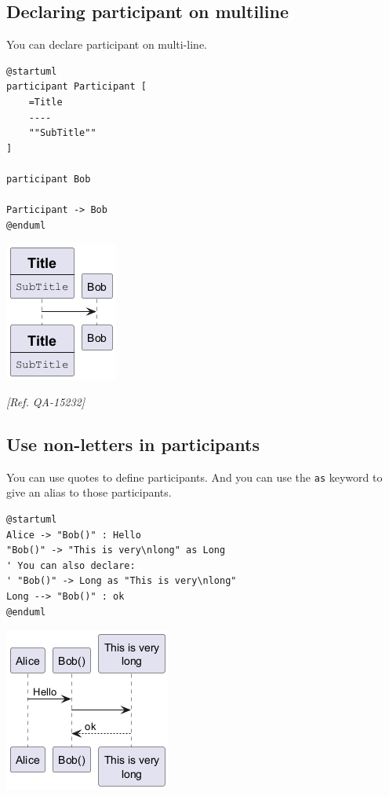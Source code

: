 \subsection{Declaring participant on multiline}


You can declare participant on multi-line.


\begin{verbatim}
@startuml
participant Participant [
    =Title
    ----
    ""SubTitle""
]

participant Bob

Participant -> Bob
@enduml
\end{verbatim}
\begin{center}
\includegraphics[scale=0.60]{imgw/img-2aeb582e872a4b823c6ed833d727d9a1.png}
\end{center}


\textit{[Ref. QA-15232]}
%
%
\subsection{Use non-letters in participants}




You can use quotes to define participants.
And you can use the \texttt{as} keyword to give an alias to those participants.
\begin{verbatim}
@startuml
Alice -> "Bob()" : Hello
"Bob()" -> "This is very\nlong" as Long
' You can also declare:
' "Bob()" -> Long as "This is very\nlong"
Long --> "Bob()" : ok
@enduml
\end{verbatim}
\begin{center}
\includegraphics[scale=0.60]{imgw/img-c49b682a2712ca0450d139146bf5eb11.png}
\end{center}


